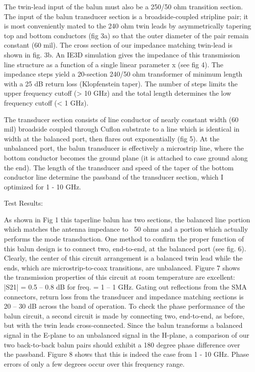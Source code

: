 The twin-lead input of the balun must also be a 250/50 ohm transition
section. The input of the balun transducer section is a broadside-coupled
stripline pair; it is most conveniently mated to the 240 ohm twin
leads by asymmetrically tapering top and bottom conductors (fig 3a)
so that the outer diameter of the pair remain constant (60 mil).
The cross section
of our impedance matching twin-lead is shown in fig. 3b.
An IE3D simulation gives the impedance of this transmission line structure
as a function of a single linear parameter x (see fig 4). The 
impedance steps yield a 20-section 240/50 ohm transformer of minimum
length with a 
25 dB return loss (Klopfenstein taper). The number of steps limits
the upper frequency cutoff (> 10 GHz) and the total length determines
the low frequency cutoff (< 1 GHz). 

The transducer section consists of line conductor of nearly constant width 
(60 mil) broadside coupled through Cuflon substrate to a line which is
identical in width at the balanced port, then flares out exponentially (fig 5).
At the unbalanced port, the balun transducer is effectively a microstrip
line, where the bottom conductor becomes the ground plane (it is attached to
case ground along the end). The length
of the transducer and speed of the taper of the bottom conductor line
determine the passband of
the transducer section, which I optimized for 1 - 10 GHz.    

Test Results:

As shown in Fig 1 this taperline balun has two sections, the balanced
line portion which matches the antenna impedance to ~50 ohms and
a portion which actually performs the mode transduction.
One method to confirm the proper function of this balun design is
to connect two, end-to-end, at the balanced port (see fig. 6).
Clearly, the center of this circuit arrangement is a balanced twin lead
while the ends, which are microstrip-to-coax transitions, are
unbalanced. Figure 7 shows the transmission properties of this
circuit at room temperature are excellent: |S21| = 0.5 -- 0.8 dB
for freq. = 1 -- 1 GHz. Gating out reflections from the SMA
connectors, return loss from the transducer and impedance
matching sections is 20 -- 30 dB across the band of operation.
To check the phase performance of the balun circuit, a second
circuit is made by connecting two, end-to-end, as before, but with
the twin leads cross-connected. Since the balun transforms
a balanced signal in the E-plane to an unbalanced signal in the
H-plane, a comparison of our two back-to-back balun pairs should
exhibit a 180 degree phase difference over the passband. Figure 8
shows that this is indeed the case from 1 - 10 GHz. Phase errors
of only a few degrees occur over this frequency range.

